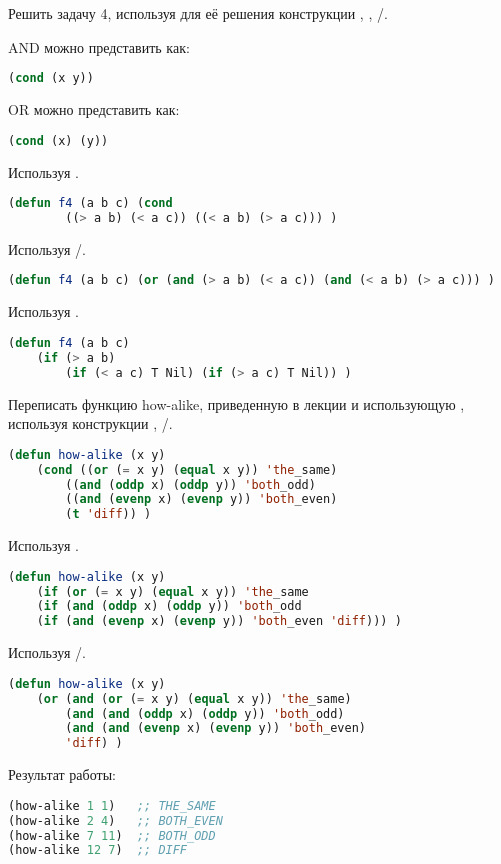 \documentclass[a4paper,oneside,12pt]{extreport}
\begin{document}
\begin{task}
	Решить задачу 4, используя для её решения конструкции , , /.

	AND можно представить как:
	\begin{lstlisting}[language=Lisp]
	(cond (x y))
	\end{lstlisting}

	OR можно представить как:
	\begin{lstlisting}[language=Lisp]
	(cond (x) (y))
	\end{lstlisting}
	
	Используя .	
	\begin{lstlisting}[language=Lisp]
(defun f4 (a b c) (cond 
		((> a b) (< a c)) ((< a b) (> a c))) )
	\end{lstlisting}

	Используя /.	
	\begin{lstlisting}[language=Lisp]
(defun f4 (a b c) (or (and (> a b) (< a c)) (and (< a b) (> a c))) )
	\end{lstlisting}

	Используя  .	
	\begin{lstlisting}[language=Lisp]
(defun f4 (a b c) 
	(if (> a b) 
		(if (< a c) T Nil) (if (> a c) T Nil)) )
	\end{lstlisting}

\end{task}

\begin{task}
	Переписать функцию how-alike, приведенную в лекции и использующую , используя  конструкции , /.

	\begin{lstlisting}[language=Lisp]
(defun how-alike (x y)
	(cond ((or (= x y) (equal x y)) 'the_same)
		((and (oddp x) (oddp y)) 'both_odd)
		((and (evenp x) (evenp y)) 'both_even) 
		(t 'diff)) )
	\end{lstlisting}


	Используя  .	
	\begin{lstlisting}[language=Lisp]
(defun how-alike (x y)
	(if (or (= x y) (equal x y)) 'the_same
	(if (and (oddp x) (oddp y)) 'both_odd 
	(if (and (evenp x) (evenp y)) 'both_even 'diff))) )
	\end{lstlisting}


	Используя  /.	
	\begin{lstlisting}[language=Lisp]
(defun how-alike (x y)
	(or (and (or (= x y) (equal x y)) 'the_same)
		(and (and (oddp x) (oddp y)) 'both_odd)
		(and (and (evenp x) (evenp y)) 'both_even)
		'diff) )
	\end{lstlisting}

	Результат работы:

	\begin{lstlisting}[language=Lisp]
(how-alike 1 1)   ;; THE_SAME
(how-alike 2 4)   ;; BOTH_EVEN
(how-alike 7 11)  ;; BOTH_ODD
(how-alike 12 7)  ;; DIFF
	\end{lstlisting}

\end{task}
\end{document}
